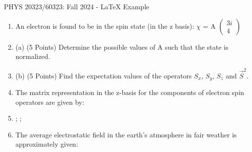 \documentclass[12pt]{article}
\begin{document}
\def\pos{\medskip\quad}
\def\subpos{\smallskip \qquad}
\begin{center}
{\Large
PHYS  20323/60323: Fall 2024 - LaTeX Example
}\\
\end{center}
\begin{enumerate}
    \item An electron is found to be in the spin state (in the z basis):   $\chi$ = A $\begin{pmatrix} 3i  \\ 4  \end{pmatrix}$
        \item[\ding{32}] (a) (5 Points) Determine the possible values of A such that the state is normalized.                        
        \item[\ding{32}] (b) (5 Points) Find the expectation values of the operators  {\color{red}$S_{x}$}, {\color{purple}$S_{y}$}, {\color{orange}$S_{z}$} and $\overrightarrow{S}^{2}$.   
        \item[\ding{32}] The matrix representation in the z-basis for the components of electron spin operators are given by:
        \item[\ding{32}] {}; ; \hspace{1cm} {}
    \item The average electrostatic field in the earth's atmosphere in fair weather is approximately given:


\end{enumerate}
\end{document}
